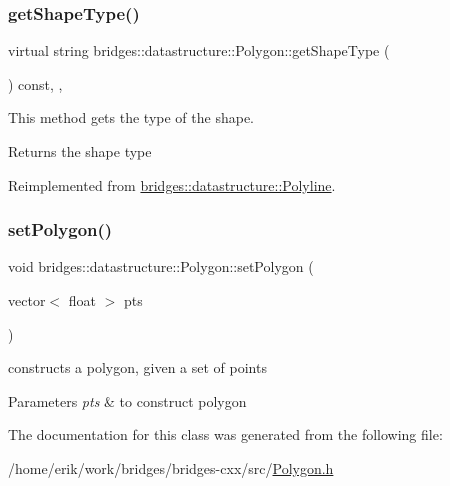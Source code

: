 \subsubsection{\texorpdfstring{get\+Shape\+Type()}{getShapeType()}}
{\footnotesize\ttfamily virtual string bridges\+::datastructure\+::\+Polygon\+::get\+Shape\+Type (\begin{DoxyParamCaption}{ }\end{DoxyParamCaption}) const\hspace{0.3cm}{\ttfamily [inline]}, {\ttfamily [override]}, {\ttfamily [virtual]}}



This method gets the type of the shape. 

\begin{DoxyReturn}{Returns}
the shape type 
\end{DoxyReturn}


Reimplemented from \hyperlink{classbridges_1_1datastructure_1_1_polyline_a5cd5cf2265353c90e91564121583aed1}{bridges\+::datastructure\+::\+Polyline}.

\mbox{\label{classbridges_1_1datastructure_1_1_polygon_a058a8ec2340f15f45dab27b18978055c}} 
\subsubsection{\texorpdfstring{set\+Polygon()}{setPolygon()}}
{\footnotesize\ttfamily void bridges\+::datastructure\+::\+Polygon\+::set\+Polygon (\begin{DoxyParamCaption}\item[{vector$<$ float $>$}]{pts }\end{DoxyParamCaption})\hspace{0.3cm}{\ttfamily [inline]}}



constructs a polygon, given a set of points 


\begin{DoxyParams}{Parameters}
{\em pts} & to construct polygon \\
\hline
\end{DoxyParams}


The documentation for this class was generated from the following file\+:\begin{DoxyCompactItemize}
\item 
/home/erik/work/bridges/bridges-\/cxx/src/\hyperlink{_polygon_8h}{Polygon.\+h}\end{DoxyCompactItemize}
